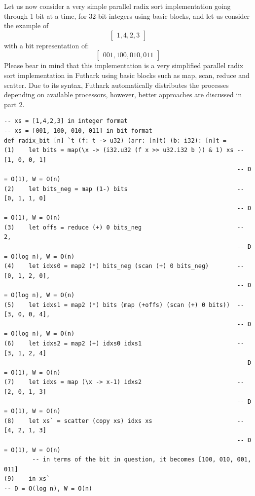 \documentclass{article}
\begin{document}
\begin{itemize}
Let us now consider a very simple parallel radix sort implementation going through 1 bit at a time, for 32-bit integers using basic blocks, and let us consider the example of
$$\begin{bmatrix} 1, 4, 2, 3\end{bmatrix}$$
with a bit representation of: 
$$\begin{bmatrix} 001, 100, 010, 011\end{bmatrix}$$
Please bear in mind that this implementation is a very simplified parallel radix sort implementation in Futhark using basic blocks such as map, scan, reduce and scatter. Due to its syntax, Futhark automatically distributes the processes depending on available processors, however, better approaches are discussed in part 2. 
\begin{lstlisting}
-- xs = [1,4,2,3] in integer format
-- xs = [001, 100, 010, 011] in bit format 
def radix_bit [n] `t (f: t -> u32) (arr: [n]t) (b: i32): [n]t =
(1)    let bits = map(\x -> (i32.u32 (f x >> u32.i32 b )) & 1) xs -- [1, 0, 0, 1]
                                                                  -- D = O(1), W = O(n)
(2)    let bits_neg = map (1-) bits                               -- [0, 1, 1, 0]
                                                                  -- D = O(1), W = O(n)
(3)    let offs = reduce (+) 0 bits_neg                           -- 2, 
                                                                  -- D = O(log n), W = O(n)
(4)    let idxs0 = map2 (*) bits_neg (scan (+) 0 bits_neg)        -- [0, 1, 2, 0],
                                                                  -- D = O(log n), W = O(n)
(5)    let idxs1 = map2 (*) bits (map (+offs) (scan (+) 0 bits))  -- [3, 0, 0, 4], 
                                                                  -- D = O(log n), W = O(n)
(6)    let idxs2 = map2 (+) idxs0 idxs1                           -- [3, 1, 2, 4]
                                                                  -- D = O(1), W = O(n)
(7)    let idxs = map (\x -> x-1) idxs2                           -- [2, 0, 1, 3]
                                                                  -- D = O(1), W = O(n)
(8)    let xs` = scatter (copy xs) idxs xs                        -- [4, 2, 1, 3]
                                                                  -- D = O(1), W = O(n)
        -- in terms of the bit in question, it becomes [100, 010, 001, 011]
(9)    in xs`                                                                                                                                -- D = O(log n), W = O(n)


\end{lstlisting}
\end{itemize}
\end{document}
